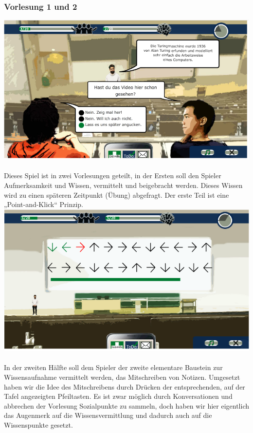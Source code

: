 \documentclass[a4paper, 11pt]{article} %
\begin{document}
\subsubsection{Vorlesung 1 und 2}
\includegraphics[scale=0.535]{images/spiel/5.png}\\\\
Dieses Spiel ist in zwei Vorlesungen geteilt, in der Ersten soll den Spieler Aufmerksamkeit und Wissen, vermittelt und beigebracht werden. Dieses Wissen wird zu einen späteren Zeitpunkt (Übung) abgefragt. Der erste Teil ist eine „Point-and-Klick“ Prinzip. \\
\includegraphics[scale=0.535]{images/spiel/15.png}\\\\
In der zweiten Hälfte soll dem Spieler der zweite elementare Baustein zur Wissensaufnahme vermittelt werden, das Mitschreiben von Notizen. Umgesetzt haben wir die Idee des Mitschreibens durch Drücken der entsprechenden, auf der Tafel angezeigten Pfeiltasten. Es ist zwar möglich durch Konversationen und abbrechen der Vorlesung Sozialpunkte zu sammeln, doch haben wir hier eigentlich das Augenmerk auf die Wissensvermittlung und dadurch auch auf die Wissenspunkte gesetzt.
\end{document}
